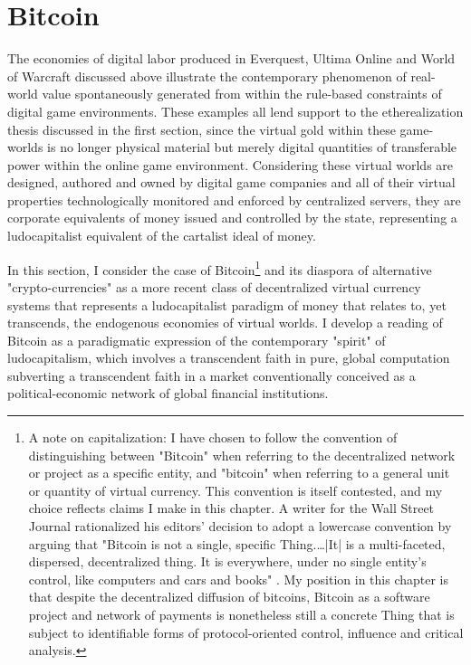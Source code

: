 \section{Bitcoin}
The economies of digital labor produced in Everquest, Ultima Online and World of Warcraft discussed above illustrate the contemporary phenomenon of real-world value spontaneously generated from within the rule-based constraints of digital game environments. These examples all lend support to the etherealization thesis discussed in the first section, since the virtual gold within these game-worlds is no longer physical material but merely digital quantities of transferable power within the online game environment. Considering these virtual worlds are designed, authored and owned by digital game companies and all of their virtual properties technologically monitored and enforced by centralized servers, they are corporate equivalents of money issued and controlled by the state, representing a ludocapitalist equivalent of the cartalist ideal of money.

In this section, I consider the case of Bitcoin\footnote{
  A note on capitalization: I have chosen to follow the convention of distinguishing between "Bitcoin" when referring to the decentralized network or project as a specific entity, and "bitcoin" when referring to a general unit or quantity of virtual currency. This convention is itself contested, and my choice reflects claims I make in this chapter. A writer for the Wall Street Journal rationalized his editors' decision to adopt a lowercase convention by arguing that "Bitcoin is not a single, specific Thing.…|It| is a multi-faceted, dispersed, decentralized thing. It is everywhere, under no single entity's control, like computers and cars and books" \autocite{Vigna14}. My position in this chapter is that despite the decentralized diffusion of bitcoins, Bitcoin as a software project and network of payments is nonetheless still a concrete Thing that is subject to identifiable forms of protocol-oriented control, influence and critical analysis.
}
and its diaspora of alternative "crypto-currencies" as a more recent class of decentralized virtual currency systems that represents a ludocapitalist paradigm of money that relates to, yet transcends, the endogenous economies of virtual worlds. I develop a reading of Bitcoin as a paradigmatic expression of the contemporary "spirit" of ludocapitalism, which involves a transcendent faith in pure, global computation subverting a transcendent faith in a market conventionally conceived as a political-economic network of global financial institutions.

